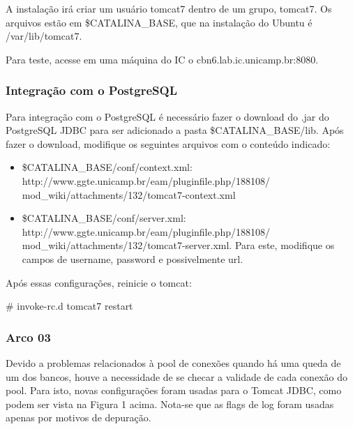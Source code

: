 \documentclass[a4paper,10pt]{article}
\begin{document}
        A instalação irá criar um usuário tomcat7 dentro de um grupo, tomcat7. Os arquivos estão em \$CATALINA\_BASE, que na instalação do Ubuntu é /var/lib/tomcat7.

        Para teste, acesse em uma máquina do IC o cbn6.lab.ic.unicamp.br:8080.

        \subsubsection{Integração com o PostgreSQL}
        Para integração com o PostgreSQL é necessário fazer o download do .jar do PostgreSQL JDBC para ser adicionado a pasta \$CATALINA\_BASE/lib. Após fazer o download, modifique os seguintes arquivos com o conteúdo indicado:

        \begin{itemize}
        \setlength{\itemindent}{-.0in}
            \item \$CATALINA\_BASE/conf/context.xml: http://www.ggte.unicamp.br/eam/pluginfile.php/188108/
            mod\_wiki/attachments/132/tomcat7-context.xml
            \item \$CATALINA\_BASE/conf/server.xml: http://www.ggte.unicamp.br/eam/pluginfile.php/188108/
            mod\_wiki/attachments/132/tomcat7-server.xml. Para este, modifique os campos de username, password e possivelmente url.
        \end{itemize}

        Após essas configurações, reinicie o tomcat:

        \begin{spverbatim}
        # invoke-rc.d tomcat7 restart
        \end{spverbatim}

        \subsubsection{Arco 03} 
        
        Devido a problemas relacionados à pool de conexões quando há uma queda de um dos bancos, houve a necessidade de se checar a validade de cada conexão do pool. Para isto, novas configurações foram usadas para o Tomcat JDBC, como podem ser vista na Figura 1 acima. Nota-se que as flags de log foram usadas apenas por motivos de depuração.
       
\end{document}
